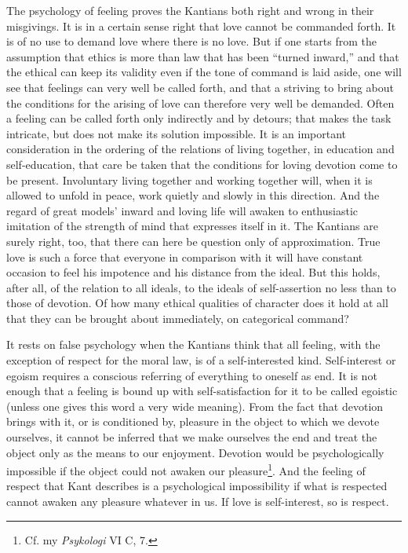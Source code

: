 \documentclass[12pt,a4paper,openany]{book}
\newcommand{\opage}[1]{\marginnote{\footnotesize\textit{[#1]}}}
\begin{document}
The psychology of feeling proves the Kantians both right and wrong in their misgivings. It is in a certain sense right
that love cannot be commanded forth. It is of no use to demand love where there is no love. But if one starts from the
assumption that ethics is more than law that has been ``turned inward,'' and that the ethical can keep its validity
even if the tone of command is laid aside, one will see that feelings can very well be called forth, and that a
striving to bring about the conditions for the arising of love can therefore very well be demanded. Often a feeling
can be called forth only indirectly and by detours; that makes the task intricate, but does not make its solution
impossible. It is an important consideration in the ordering of the relations of living together, in education and
self-education, that care be taken that the conditions for loving devotion come to be present. Involuntary living
together and working together will, when it is allowed to unfold in peace, work quietly and slowly in this direction.
And the regard of great models' inward and loving life will awaken to enthusiastic imitation of the strength of mind
that expresses itself in it. The Kantians are surely right, too, that there can here be question only of
approximation. True love is such a force that everyone in comparison with it will have constant occasion to feel his
impotence and his distance from the ideal. But this holds, after all, of the relation to all ideals, to the ideals of
self-assertion no less than to those of devotion. Of how many ethical qualities of character does it hold at all that
they can be brought about immediately, on categorical command?

It rests on false psychology when the Kantians think that all feeling, with the exception of respect for the moral
law,
\opage{242}is of a self-interested kind. Self-interest or egoism requires a conscious referring of everything to
oneself as end. It is not enough that a feeling is bound up with self-satisfaction for it to be called egoistic
(unless one gives this word a very wide meaning). From the fact that devotion brings with it, or is conditioned by,
pleasure in the object to which we devote ourselves, it cannot be inferred that we make ourselves the end and treat
the object only as the means to our enjoyment. Devotion would be psychologically impossible if the object could not
awaken our pleasure\footnote[1]{Cf. my \textit{Psykologi} VI C, 7.}. And the feeling of respect that Kant describes
is a psychological impossibility if what is respected cannot awaken any pleasure whatever in us. If love is
self-interest, so is respect.
\end{document}
